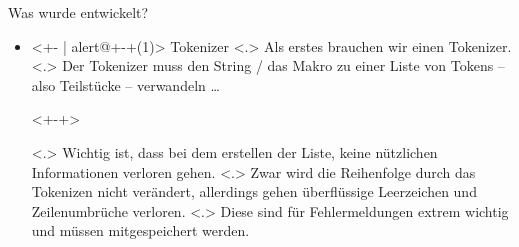   \begin{frame}{Was wurde entwickelt?}
    \begin{itemize}[<+- | alert@+>]
      \item<+- | alert@+-+(1)>
        Tokenizer
            \note[item]<.>{
              Als erstes brauchen wir einen Tokenizer.
            }
            \note[item]<.>{
              Der Tokenizer muss den String / das Makro zu einer Liste von Tokens -- also Teilstücke -- verwandeln \ldots
            }
        \begin{uncoverenv}<+-+>%
        \end{uncoverenv}%
            \note[item]<.>{
              Wichtig ist, dass bei dem erstellen der Liste, keine nützlichen Informationen verloren gehen.
            }
            \note[item]<.>{
              Zwar wird die Reihenfolge durch das Tokenizen nicht verändert, allerdings gehen überflüssige Leerzeichen und Zeilenumbrüche verloren.
            }
            \note[item]<.>{
              Diese sind für Fehlermeldungen extrem wichtig und müssen mitgespeichert werden.
            }


\end{itemize}
\end{frame}
